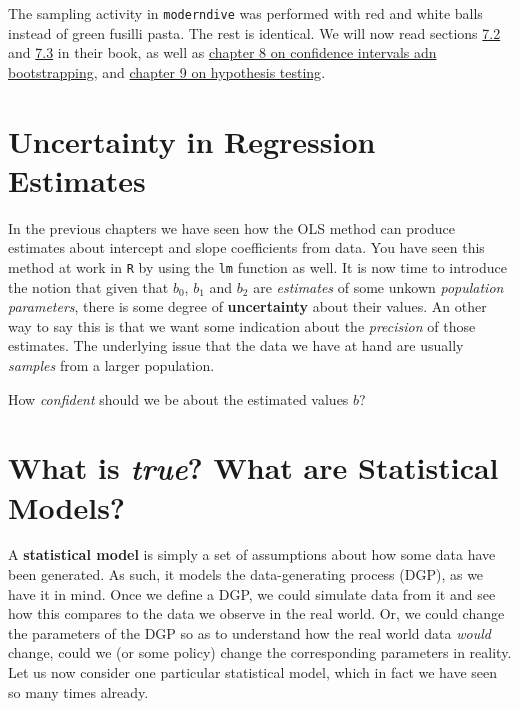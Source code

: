 \documentclass[]{book}
\newenvironment{note}{\begin{tcolorbox}[colback=blue!5!white,colframe=blue!75!black]}{\end{tcolorbox}}
\begin{document}
The sampling activity in \texttt{moderndive} was performed with red and
white balls instead of green fusilli pasta. The rest is identical. We
will now read sections
\href{https://moderndive.com/7-sampling.html\#sampling-simulation}{7.2}
and
\href{https://moderndive.com/7-sampling.html\#sampling-framework}{7.3}
in their book, as well as
\href{https://moderndive.com/8-confidence-intervals.html}{chapter 8 on
confidence intervals adn bootstrapping}, and
\href{https://moderndive.com/9-hypothesis-testing.html}{chapter 9 on
hypothesis testing}.

\section{Uncertainty in Regression
Estimates}\label{uncertainty-in-regression-estimates}

In the previous chapters we have seen how the OLS method can produce
estimates about intercept and slope coefficients from data. You have
seen this method at work in \texttt{R} by using the \texttt{lm} function
as well. It is now time to introduce the notion that given that \(b_0\),
\(b_1\) and \(b_2\) are \emph{estimates} of some unkown \emph{population
parameters}, there is some degree of \textbf{uncertainty} about their
values. An other way to say this is that we want some indication about
the \emph{precision} of those estimates. The underlying issue that the
data we have at hand are usually \emph{samples} from a larger
population.

\begin{note}
How \emph{confident} should we be about the estimated values \(b\)?
\end{note}

\section{\texorpdfstring{What is \emph{true}? What are Statistical
Models?}{What is true? What are Statistical Models?}}\label{what-is-true-what-are-statistical-models}

A \textbf{statistical model} is simply a set of assumptions about how
some data have been generated. As such, it models the data-generating
process (DGP), as we have it in mind. Once we define a DGP, we could
simulate data from it and see how this compares to the data we observe
in the real world. Or, we could change the parameters of the DGP so as
to understand how the real world data \emph{would} change, could we (or
some policy) change the corresponding parameters in reality. Let us now
consider one particular statistical model, which in fact we have seen so
many times already.
\end{document}
